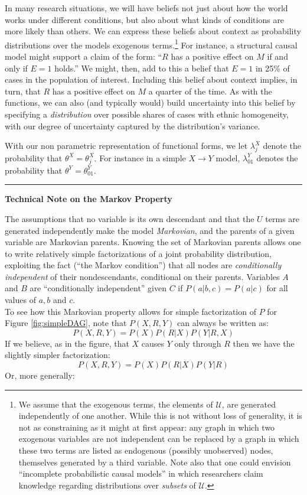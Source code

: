 \documentclass[
  12pt,
]{book}
\begin{document}
In many research situations, we will have beliefs not just about how the world works under different conditions, but also about what kinds of conditions are more likely than others. We can express these beliefs about context as probability distributions over the models exogenous terms.\footnote{We assume that the exogenous terms, the elements of \(\mathcal{U}\), are generated independently of one another. While this is not without loss of generality, it is not as constraining as it might at first appear: any graph in which two exogenous variables are not independent can be replaced by a graph in which these two terms are listed as endogenous (possibly unobserved) nodes, themselves generated by a third variable. Note also that one could envision ``incomplete probabilistic causal models'' in which researchers claim knowledge regarding distributions over \emph{subsets} of \(\mathcal{U}\).} For instance, a structural causal model might support a claim of the form: ``\(R\) has a positive effect on \(M\) if and only if \(E=1\) holds.'' We might, then, add to this a belief that \(E=1\) in 25\% of cases in the population of interest. Including this belief about context implies, in turn, that \(R\) has a positive effect on \(M\) a quarter of the time. As with the functions, we can also (and typically would) build uncertainty into this belief by specifying a \emph{distribution} over possible shares of cases with ethnic homogeneity, with our degree of uncertainty captured by the distribution's variance.

With our non parametric representation of functional forms, we let \(\lambda_j^X\) denote the probability that \(\theta^X = \theta^X_j\). For instance in a simple \(X \rightarrow Y\) model, \(\lambda^Y_{01}\) denotes the probability that \(\theta^Y = \theta^Y_{01}\).

\begin{center}\rule{0.5\linewidth}{0.5pt}\end{center}

\textbf{Technical Note on the Markov Property}

The assumptions that no variable is its own descendant and that the \(U\) terms are generated independently make the model \emph{Markovian}, and the parents of a given variable are Markovian parents. Knowing the set of Markovian parents allows one to write relatively simple factorizations of a joint probability distribution, exploiting the fact (``the Markov condition'') that all nodes are \emph{conditionally independent} of their nondescendants, conditional on their parents. Variables \(A\) and \(B\) are ``conditionally independent'' given \(C\) if \(P(a|b,c) = P(a|c)\) for all values of \(a, b\) and \(c\).\\
To see how this Markovian property allows for simple factorization of \(P\) for Figure \ref{fig:simpleDAG}, note that \(P(X, R, Y)\) can always be written as:
\[P(X, R, Y) = P(X)P(R|X)P(Y|R, X)\]
If we believe, as in the figure, that \(X\) causes \(Y\) only through \(R\) then we have the slightly simpler factorization:
\[P(X, R, Y) = P(X)P(R|X)P(Y|R)\]
Or, more generally:
\end{document}
